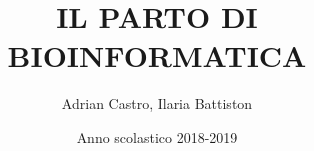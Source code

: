 \documentclass{article}
\title{IL PARTO DI BIOINFORMATICA}
\author{Adrian Castro, Ilaria Battiston}
\date{Anno scolastico 2018-2019}
\begin{document}
\maketitle

\lfoot{}
\cfoot{}
\rfoot{\thepage}

\newpage
\tableofcontents
\newpage















\end{document}
